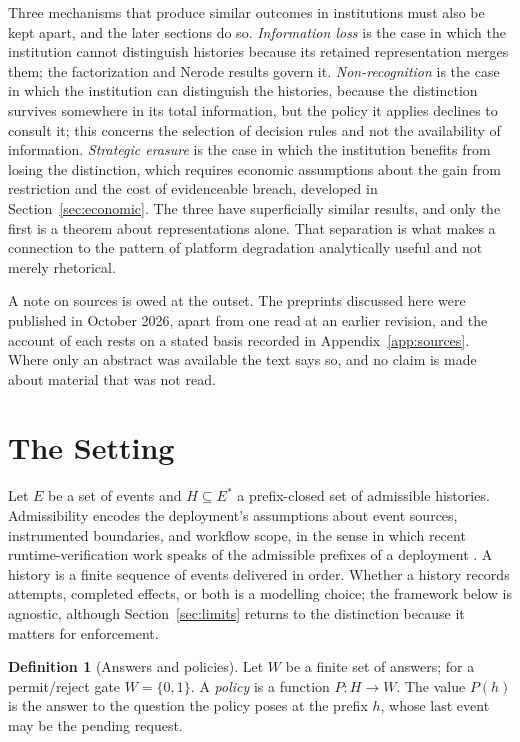 \documentclass[11pt]{article}
\theoremstyle{definition}
\newtheorem{definition}{Definition}
\theoremstyle{remark}
\newcommand{\Ev}{E}
\newcommand{\Hist}{H}
\newcommand{\Bool}{\{0,1\}}
\begin{document}
Three mechanisms that produce similar outcomes in institutions must also be kept apart, and the later sections do so. \emph{Information loss} is the case in which the institution cannot distinguish histories because its retained representation merges them; the factorization and Nerode results govern it. \emph{Non-recognition} is the case in which the institution can distinguish the histories, because the distinction survives somewhere in its total information, but the policy it applies declines to consult it; this concerns the selection of decision rules and not the availability of information. \emph{Strategic erasure} is the case in which the institution benefits from losing the distinction, which requires economic assumptions about the gain from restriction and the cost of evidenceable breach, developed in Section~\ref{sec:economic}. The three have superficially similar results, and only the first is a theorem about representations alone. That separation is what makes a connection to the pattern of platform degradation analytically useful and not merely rhetorical.

A note on sources is owed at the outset. The preprints discussed here were published in October 2026, apart from one read at an earlier revision, and the account of each rests on a stated basis recorded in Appendix~\ref{app:sources}. Where only an abstract was available the text says so, and no claim is made about material that was not read.

\section{The Setting}\label{sec:setting}

Let $\Ev$ be a set of events and $\Hist\subseteq \Ev^{*}$ a prefix-closed set of admissible histories. Admissibility encodes the deployment's assumptions about event sources, instrumented boundaries, and workflow scope, in the sense in which recent runtime-verification work speaks of the admissible prefixes of a deployment \cite{agenticrv}. A history is a finite sequence of events delivered in order. Whether a history records attempts, completed effects, or both is a modelling choice; the framework below is agnostic, although Section~\ref{sec:limits} returns to the distinction because it matters for enforcement.

\begin{definition}[Answers and policies]
Let $W$ be a finite set of answers; for a permit/reject gate $W=\Bool$. A \emph{policy} is a function $P:\Hist\to W$. The value $P(h)$ is the answer to the question the policy poses at the prefix $h$, whose last event may be the pending request.
\end{definition}
\end{document}
